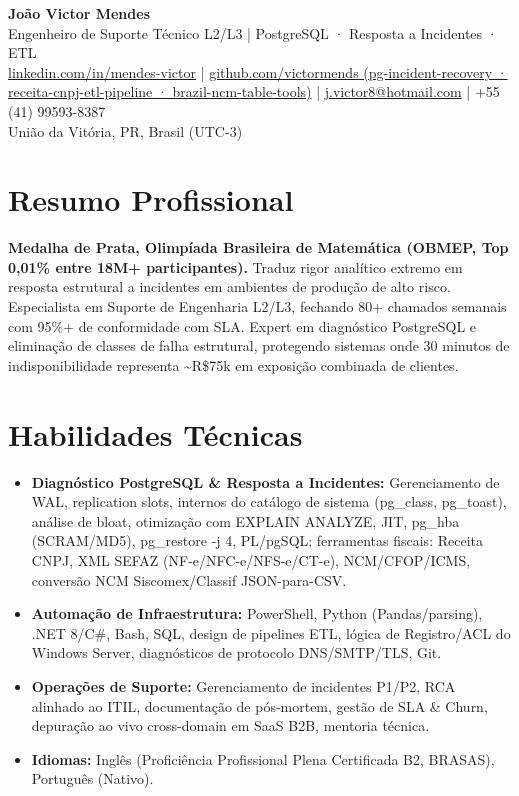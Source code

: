 \documentclass[11pt,a4paper]{article}
\begin{document}
\begin{center}
    {\huge \textbf{João Victor Mendes}} \\
    \vspace{4pt}
    {\large Engenheiro de Suporte Técnico L2/L3 | PostgreSQL · Resposta a Incidentes · ETL} \\
    \vspace{2pt}
    \href{https://linkedin.com/in/mendes-victor}{linkedin.com/in/mendes-victor} | \href{https://github.com/victormends}{github.com/victormends \small(pg-incident-recovery · receita-cnpj-etl-pipeline · brazil-ncm-table-tools)} | \href{mailto:j.victor8@hotmail.com}{j.victor8@hotmail.com} | +55 (41) 99593-8387 \\
    União da Vitória, PR, Brasil (UTC-3)
\end{center}

\section{Resumo Profissional}
\textbf{Medalha de Prata, Olimpíada Brasileira de Matemática (OBMEP, Top 0,01\% entre 18M+ participantes).} Traduz rigor analítico extremo em resposta estrutural a incidentes em ambientes de produção de alto risco. Especialista em Suporte de Engenharia L2/L3, fechando 80+ chamados semanais com 95\%+ de conformidade com SLA. Expert em diagnóstico PostgreSQL e eliminação de classes de falha estrutural, protegendo sistemas onde 30 minutos de indisponibilidade representa \textasciitilde R\$75k em exposição combinada de clientes.

\section{Habilidades Técnicas}
\begin{itemize}
    \item \textbf{Diagnóstico PostgreSQL \& Resposta a Incidentes:} Gerenciamento de WAL, replication slots, internos do catálogo de sistema (pg\_class, pg\_toast), análise de bloat, otimização com EXPLAIN ANALYZE, JIT, pg\_hba (SCRAM/MD5), pg\_restore -j 4, PL/pgSQL; ferramentas fiscais: Receita CNPJ, XML SEFAZ (NF-e/NFC-e/NFS-e/CT-e), NCM/CFOP/ICMS, conversão NCM Siscomex/Classif JSON-para-CSV.
    \item \textbf{Automação de Infraestrutura:} PowerShell, Python (Pandas/parsing), .NET 8/C\#, Bash, SQL, design de pipelines ETL, lógica de Registro/ACL do Windows Server, diagnósticos de protocolo DNS/SMTP/TLS, Git.
    \item \textbf{Operações de Suporte:} Gerenciamento de incidentes P1/P2, RCA alinhado ao ITIL, documentação de pós-mortem, gestão de SLA \& Churn, depuração ao vivo cross-domain em SaaS B2B, mentoria técnica.
    \item \textbf{Idiomas:} Inglês (Proficiência Profissional Plena Certificada B2, BRASAS), Português (Nativo).
\end{itemize}
\end{document}
